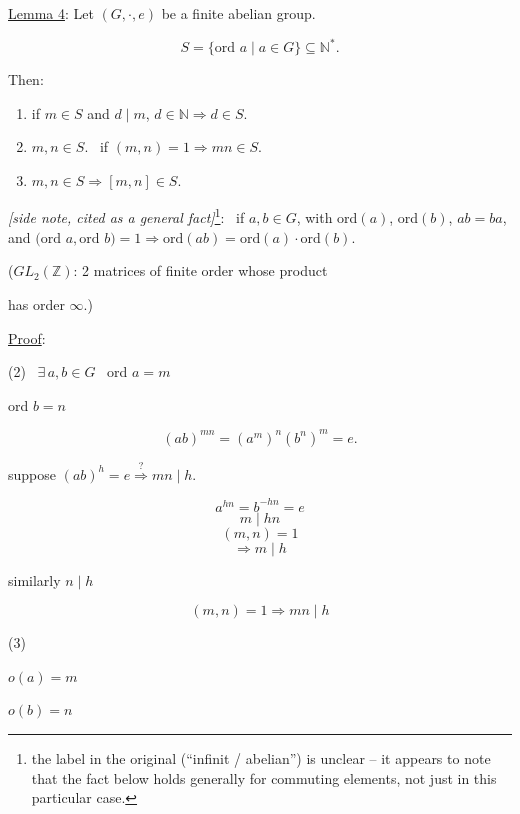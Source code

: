 \documentclass[12pt]{article}
\begin{document}
\noindent\underline{Lemma 4}: Let $(G,\cdot,e)$ be a finite abelian group.

\[
S=\{\text{ord } a \mid a\in G\} \subseteq \mathbb{N}^*.
\]

\bigskip
\noindent Then:

\begin{enumerate}
\item[(1)] if $m\in S$ and $d\mid m$, $d\in\mathbb{N} \Rightarrow d\in S$.
\item[(2)] $m,n\in S$. \ if $(m,n)=1 \Rightarrow mn\in S$.
\item[(3)] $m,n\in S \Rightarrow [m,n]\in S$.
\end{enumerate}

\bigskip
\noindent\textit{[side note, cited as a general fact]}\footnote{the label in the original (``infinit / abelian'') is unclear -- it appears to note that the fact below holds generally for commuting elements, not just in this particular case.}: \ if $a,b\in G$, with ord$(a)$, ord$(b)$, $ab=ba$, and $\big(\text{ord } a,\text{ord } b\big)=1 \Rightarrow \text{ord}(ab)=\text{ord}(a)\cdot\text{ord}(b)$.

\bigskip
\noindent\big($GL_2(\mathbb{Z})$: 2 matrices of finite order whose product

\noindent has order $\infty$.\big)

\bigskip
\noindent\underline{Proof}:

\bigskip
\noindent (2) \ $\exists\, a,b\in G$ \ ord $a=m$

\noindent ord $b=n$

\[
(ab)^{mn} = (a^m)^n(b^n)^m = e.
\]

\noindent suppose $(ab)^h=e \overset{?}{\Longrightarrow} mn\mid h$.

\[
a^{hn}=b^{-hn}=e
\]
\[
m\mid hn
\]
\[
(m,n)=1
\]
\[
\Rightarrow m\mid h
\]

\noindent similarly $n\mid h$

\[
(m,n)=1 \Rightarrow mn\mid h
\]

\bigskip
\noindent (3)

\noindent $o(a)=m$

\noindent $o(b)=n$
\end{document}
